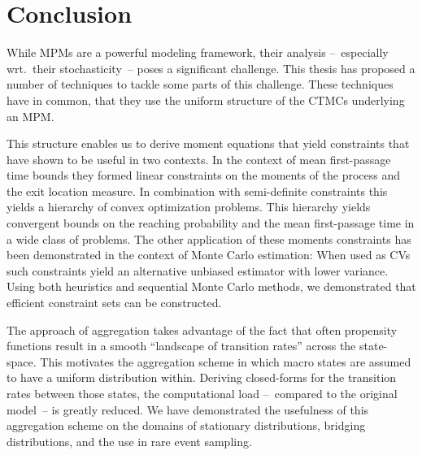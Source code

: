 \chapter{Conclusion}
While \acfp{MPM} are a powerful modeling framework, their analysis --~especially wrt.\ their stochasticity~-- poses a significant challenge.
This thesis has proposed a number of techniques to tackle some parts of this challenge.
These techniques have in common, that they use the uniform structure of the \acp{CTMC} underlying an \ac{MPM}.

This structure enables us to derive moment equations that yield constraints that have shown to be useful in two contexts.
In the context of mean first-passage time bounds they formed linear constraints on the moments of the process and the exit location measure.
In combination with semi-definite constraints this yields a hierarchy of convex optimization problems.
This hierarchy yields convergent bounds on the reaching probability and the mean first-passage time in a wide class of problems.
The other application of these moments constraints has been demonstrated in the context of Monte Carlo estimation:
When used as \acfp{CV} such constraints yield an alternative unbiased estimator with lower variance.
Using both heuristics and sequential Monte Carlo methods, we demonstrated that efficient constraint sets can be constructed.

The approach of aggregation takes advantage of the fact that often propensity functions result in a smooth ``landscape of transition rates'' across the state-space.
This motivates the aggregation scheme in which macro states are assumed to have a uniform distribution within.
Deriving closed-forms for the transition rates between those states, the computational load --~compared to the original model~-- is greatly reduced.
We have demonstrated the usefulness of this aggregation scheme on the domains of stationary distributions, bridging distributions, and the use in rare event sampling.


